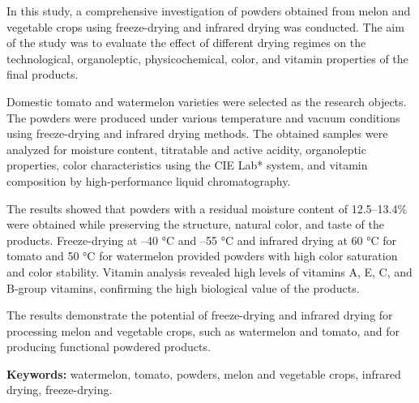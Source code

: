 In this study, a comprehensive investigation of powders obtained from
melon and vegetable crops using freeze-drying and infrared drying was
conducted. The aim of the study was to evaluate the effect of different
drying regimes on the technological, organoleptic, physicochemical,
color, and vitamin properties of the final products.

Domestic tomato and watermelon varieties were selected as the research
objects. The powders were produced under various temperature and vacuum
conditions using freeze-drying and infrared drying methods. The obtained
samples were analyzed for moisture content, titratable and active
acidity, organo\-leptic properties, color characteristics using the CIE
Lab* system, and vitamin composition by high-performance liquid
chromatography.

The results showed that powders with a residual moisture content of
12.5--13.4\% were obtained while preserving the structure, natural
color, and taste of the products. Freeze-drying at --40 °C and --55 °C
and infrared drying at 60 °C for tomato and 50 °C for watermelon
provided powders with high color saturation and color stability. Vitamin
analysis revealed high levels of vitamins A, E, C, and B-group vitamins,
confirming the high biological value of the products.

The results demonstrate the potential of freeze-drying and infrared
drying for processing melon and vegetable crops, such as watermelon and
tomato, and for producing functional powdered products.

{\bfseries Keywords:} watermelon, tomato, powders, melon and vegetable
crops, infrared drying, freeze-drying.

